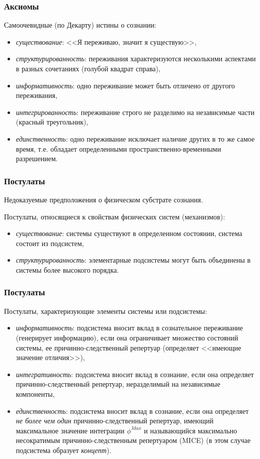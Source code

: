 \documentclass[default]{beamer}
\begin{document}
	\begin{frame}
		\frametitle{Аксиомы}
		
		Самоочевидные (по Декарту) истины о сознании:
		\begin{itemize}
			\item \textit{существование}: <<Я переживаю, значит я существую>>, 
			\item \textit{структурированность}: переживания характеризуются несколькими аспектами в разных сочетаниях (голубой квадрат справа),
			\item \textit{информативность}: одно переживание может быть отличено от другого переживания, 
			\item \textit{интегрированность}: переживание строго не разделимо на независимые части (красный треугольник),
			\item \textit{единственность}: одно переживание исключает наличие других в то же самое время, т.е. обладает определенными пространственно-временными разрешением.
		\end{itemize}
	\end{frame}

	\begin{frame}
		\frametitle{Постулаты}
		
		Недоказуемые предположения о физическом субстрате сознания.
		\par\bigskip
		Постулаты, относящиеся к свойствам физических систем (механизмов):
		\begin{itemize}
			\item \textit{существование}: системы существуют в определенном состоянии, система состоит из подсистем, 
			\item \textit{структурированность}: элементарные подсистемы могут быть объединены в системы более высокого порядка. 
		\end{itemize}
	\end{frame}

	\begin{frame}
		\frametitle{Постулаты}
		
		Постулаты, характеризующие элементы системы или подсистемы:
		\begin{itemize}
			\item \textit{информативность}: подсистема вносит вклад в сознательное переживание (генерирует информацию), если она ограничивает множество состояний системы, ее причинно-следственный репертуар (определяет <<имеющие значение отличия>>),
			\item \textit{интегративность}: подсистема вносит вклад в сознание, если она определяет причинно-следственный репертуар, неразделимый на независимые компоненты,
			\item \textit{единственность}: подсистема вносит вклад в сознание, если она определяет \textit{не более чем один} причинно-следственный репертуар, имеющий максимальное значение интеграции $\phi^{Max}$ и называющийся максимально несократимым причинно-следственным репертуаром (MICE) (в этом случае подсистема образует \textit{концепт}). 
		\end{itemize}
	\end{frame}
\end{document}
